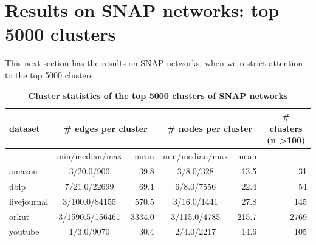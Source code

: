\documentclass[aps,pre,superscriptaddress]{article}
\begin{document}
\clearpage


\newpage
\section{Results on SNAP networks: top 5000 clusters}


This next section has the results on SNAP networks, when we restrict attention to the top 5000 clusters.

\begin{table}[!htpb]
	\caption{\textbf{Cluster statistics of the top 5000 clusters of SNAP networks}}
	\begin{tabular}{lcrcrr}
		\hline
		dataset     & \multicolumn{2}{c}{\# edges per cluster} & \multicolumn{2}{c}{\# nodes per cluster} & \multicolumn{1}{c}{\# clusters (n \textgreater 100)}                                \\
		\hline

		            & min/median/max                           & mean                                     & min/median/max                                       & mean  & \multicolumn{1}{l}{} \\
		\hline
		\hline
		amazon      & 3/20.0/900                               & 39.8                                     & 3/8.0/328                                            & 13.5  & 31                   \\
		dblp        & 7/21.0/22699                             & 69.1                                     & 6/8.0/7556                                           & 22.4  & 54                   \\
		livejournal & 3/100.0/84155                            & 570.5                                    & 3/16.0/1441                                          & 27.8  & 145                  \\
		orkut       & 3/1590.5/156461                          & 3334.0                                   & 3/115.0/4785                                         & 215.7 & 2769                 \\
		youtube     & 1/3.0/9070                               & 30.4                                     & 2/4.0/2217                                           & 14.6  & 105                  \\
		\hline
	\end{tabular}


\end{table}

\clearpage
\end{document}
